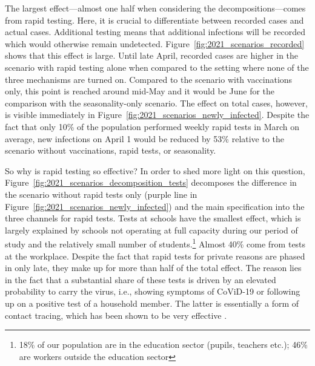 The largest effect---almost one half when considering the decompositions---comes from
rapid testing. Here, it is crucial to differentiate between recorded cases and actual
cases. Additional testing means that additional infections will be recorded which would
otherwise remain undetected. Figure~\ref{fig:2021_scenarios_recorded} shows that this
effect is large. Until late April, recorded cases are higher in the scenario with rapid
testing alone when compared to the setting where none of the three mechanisms are turned
on. Compared to the scenario with vaccinations only, this point is reached around
mid-May and it would be June for the comparison with the seasonality-only scenario. The
effect on total cases, however, is visible immediately in
Figure~\ref{fig:2021_scenarios_newly_infected}. Despite the fact that only 10\%  of the
population performed weekly rapid tests in March on average, new infections on April 1
would be reduced by 53\% relative to the scenario without vaccinations, rapid tests, or
seasonality.

So why is rapid testing so effective? In order to shed more light on this question,
Figure~\ref{fig:2021_scenarios_decomposition_tests} decomposes the difference in the
scenario without rapid tests only (purple line in
Figure~\ref{fig:2021_scenarios_newly_infected}) and the main specification into the
three channels for rapid tests. Tests at schools have the smallest effect, which is
largely explained by schools not operating at full capacity during our period of study
and the relatively small number of students.\footnote{18\% of our population are in the
education sector (pupils, teachers etc.); 46\% are workers outside the education sector}
Almost 40\% come from tests at the workplace. Despite the fact that rapid tests for
private reasons are phased in only late, they make up for more than half of the total
effect. The reason lies in the fact that a substantial share of these tests is driven by
an elevated probability to carry the virus, i.e., showing symptoms of CoViD-19 or
following up on a positive test of a household member. The latter is essentially a form
of contact tracing, which has been shown to be very effective \citep{Contreras2021,
Kretzschmar2020,FetzerGraeber2021}.

